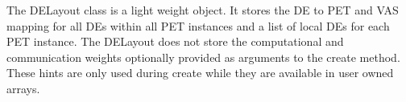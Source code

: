 

The DELayout class is a light weight object. It stores the DE to PET and VAS mapping for all DEs within all PET instances and a list of local DEs for each PET instance. The DELayout does not store the computational and communication weights optionally provided as arguments to the create method. These hints are only used during create while they are available in user owned arrays.
